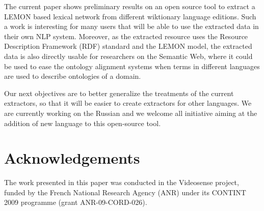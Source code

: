 \documentclass[10pt, a4paper]{article}
\begin{document}
The current paper shows preliminary results on an open source tool to extract a LEMON based lexical network from different wiktionary language editions. Such a work is interesting for many users that will be able to use the extracted data in their own NLP system. Moreover, as the extracted resource uses the Resource Description Framework (RDF) standard and the LEMON model, the extracted data is also directly usable for researchers on the Semantic Web, where it could be used to ease the ontology alignment systems when terms in different languages are used to describe ontologies of a domain.

Our next objectives are to better generalize the treatments of the current extractors, so that it will be easier to create extractors for other languages. We are currently working on the Russian and we welcome all initiative aiming at the addition of new language to this open-source tool.

\section{Acknowledgements}

The work presented in this paper was conducted in the Videosense project, funded by the French National Research Agency (ANR) under its CONTINT 2009 programme (grant ANR-09-CORD-026).


\end{document}
